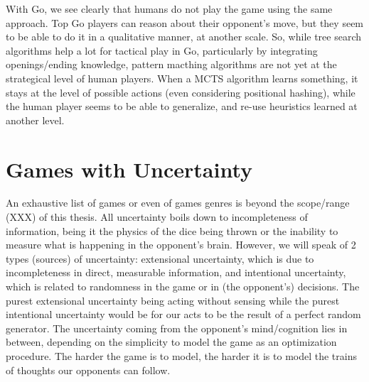 With Go, we see clearly that humans do not play the game using the same approach. Top Go players can reason about their opponent's move, but they seem to be able to do it in a qualitative manner, at another scale. So, while tree search algorithms help a lot for tactical play in Go, particularly by integrating openings/ending knowledge, pattern macthing algorithms are not yet at the strategical level of human players. When a MCTS algorithm learns something, it stays at the level of possible actions (even considering positional hashing), while the human player seems to be able to generalize, and re-use heuristics learned at another level.


\section{Games with Uncertainty}
An exhaustive list of games or even of games genres is beyond the scope/range (XXX) of this thesis. %
All uncertainty boils down to incompleteness of information, being it the physics of the dice being thrown or the inability to measure what is happening in the opponent's brain. However,  we will speak of 2 types (sources) of uncertainty: extensional uncertainty, which is due to incompleteness in direct, measurable information, and intentional uncertainty, which is related to randomness in the game or in (the opponent's) decisions. The purest extensional uncertainty being acting without sensing while the purest intentional uncertainty would be for our acts to be the result of a perfect random generator. The uncertainty coming from the opponent's mind/cognition lies in between, depending on the simplicity to model the game as an optimization procedure. The harder the game is to model, the harder it is to model the trains of thoughts our opponents can follow.

